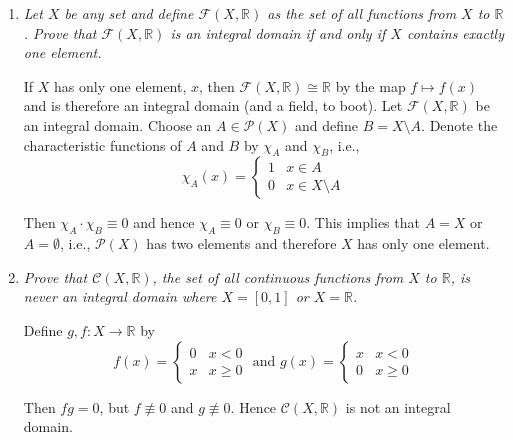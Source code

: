 \documentclass[letterpaper, 11pt]{article}
\newcommand{\powset}[1]{
\mathcal{P}\left(#1\right)
}
\newcommand{\R}{\mathbb{R}}
\begin{document}
\begin{enumerate}
\item \emph{Let $X$ be any set and define $\mathcal{F}(X, \R)$ as the set of all functions from $X$ to $\R$.  Prove that $\mathcal{F}(X, \R)$ is an integral domain if and only if $X$ contains exactly one element.}

If $X$ has only one element, $x$, then $\mathcal{F}(X,\R) \cong \R$ by the map $f \mapsto f(x)$ and is therefore an integral domain (and a field, to boot).  Let $\mathcal{F}(X,\R)$ be an integral domain.  Choose an $A \in \powset{X}$ and define $B = X \setminus A$.  Denote the characteristic functions of $A$ and $B$ by $\chi_A$ and $\chi_B$, i.e.,
\[
\chi_A(x) = \begin{cases} 1 & x \in A \\ 0 & x \in X \setminus A \end{cases}
\]

Then $\chi_A \cdot \chi_B \equiv 0$ and hence $\chi_A \equiv 0$ or $\chi_B \equiv 0$.  This implies that $A = X$ or $A = \emptyset$, i.e., $\powset{X}$ has two elements and therefore $X$ has only one element.

\item \emph{Prove that $\mathcal{C}(X, \R)$, the set of all continuous functions from $X$ to $\R$, is never an integral domain where $X=[0,1]$ or $X=\R$.}

Define $g,f:X \rightarrow \R$ by
\[
f(x) = \begin{cases} 0 & x < 0 \\ x & x \geq 0\end{cases} \mbox{ and } g(x) = \begin{cases} x & x < 0 \\ 0 & x \geq 0\end{cases}
\]

Then $fg = 0$, but $f \not\equiv 0$ and $g \not\equiv 0$.  Hence $\mathcal{C}(X, \R)$ is not an integral domain.

\end{enumerate}
\end{document}
